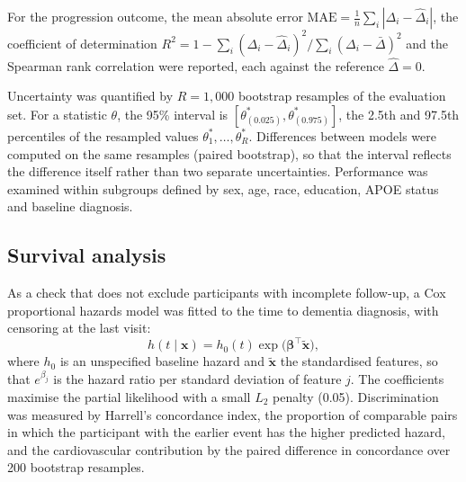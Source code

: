 For the progression outcome, the mean absolute error $\text{MAE} = \frac{1}{n}\sum_i |\Delta_i - \hat{\Delta}_i|$, the coefficient of determination $R^2 = 1 - \sum_i (\Delta_i - \hat{\Delta}_i)^2 / \sum_i (\Delta_i - \bar{\Delta})^2$ and the Spearman rank correlation were reported, each against the reference $\hat{\Delta} = 0$.

Uncertainty was quantified by $R = 1{,}000$ bootstrap resamples of the evaluation set. For a statistic $\theta$, the 95\% interval is $[\theta^{*}_{(0.025)}, \theta^{*}_{(0.975)}]$, the 2.5th and 97.5th percentiles of the resampled values $\theta^{*}_1, \dots, \theta^{*}_R$. Differences between models were computed on the same resamples (paired bootstrap), so that the interval reflects the difference itself rather than two separate uncertainties. Performance was examined within subgroups defined by sex, age, race, education, APOE status and baseline diagnosis.

\subsection{Survival analysis}
As a check that does not exclude participants with incomplete follow-up, a Cox proportional hazards model \cite{cox1972} was fitted to the time to dementia diagnosis, with censoring at the last visit:
\begin{equation}
h(t \mid \mathbf{x}) = h_0(t) \exp\big(\boldsymbol{\beta}^{\top}\tilde{\mathbf{x}}\big),
\end{equation}
where $h_0$ is an unspecified baseline hazard and $\tilde{\mathbf{x}}$ the standardised features, so that $e^{\beta_j}$ is the hazard ratio per standard deviation of feature $j$. The coefficients maximise the partial likelihood with a small $L_2$ penalty (0.05). Discrimination was measured by Harrell's concordance index, the proportion of comparable pairs in which the participant with the earlier event has the higher predicted hazard, and the cardiovascular contribution by the paired difference in concordance over 200 bootstrap resamples.
